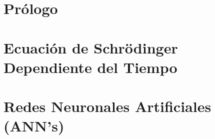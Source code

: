 \documentclass[twoside,openright,titlepage,numbers=noenddot,%
                headinclude,footinclude,cleardoublepage=empty,abstract=on,
                BCOR=5mm,paper=a4,fontsize=12pt
                ]{scrreprt}
\begin{document}
\frenchspacing
\raggedbottom

\pagestyle{plain}

\nocite{*} %



%



\pagestyle{scrheadings}
\part{Prólogo}\label{pt:Prologo}




\part{Ecuación de Schrödinger Dependiente del Tiempo}\label{pt:TDSE}





\part{Redes Neuronales Artificiales (ANN's)}\label{pt:ANNS}


%
%
\end{document}
